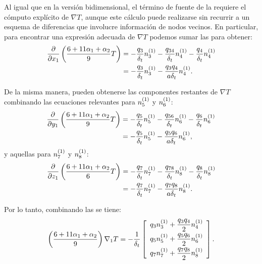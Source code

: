 Al igual que en la versi\'on bidimensional, el t\'ermino de fuente de la  requiere el c\'omputo expl\'icito de $\nabla T$, aunque este c\'alculo puede realizarse sin recurrir a un esquema de diferencias que involucre informaci\'on de nodos vecinos. En particular, para encontrar una expresi\'on adecuada de $\nabla T$ podemos sumar las  para obtener:
\begin{equation}
\begin{aligned}
	\dfrac{\partial}{\partial x_1} \left( \dfrac{6+11\alpha_1+\alpha_2}{9} T \right) &= -\dfrac{q_3}{\delta_t} n_{3}^{(1)} - \dfrac{q_{34}}{\delta_t} n_{4}^{(1)} - \dfrac{q_4}{\delta_t} n_{4}^{(1)} \\
	&= -\dfrac{q_3}{\delta_t} n_{3}^{(1)} - \dfrac{q_3 q_4}{a \delta_t} n_{4}^{(1)}.
\end{aligned}
	\label{eq:partial_1_x_3d}
\end{equation}

De la misma manera, pueden obtenerse las componentes restantes de $\nabla T$ combinando las ecuaciones relevantes para $n_{5}^{(1)}$ y $n_{6}^{(1)}$:
\begin{equation}
\begin{aligned}
	\dfrac{\partial}{\partial y_1} \left( \dfrac{6+11\alpha_1+\alpha_2}{9} T \right) &= -\dfrac{q_5}{\delta_t} n_{5}^{(1)} - \dfrac{q_{56}}{\delta_t} n_{6}^{(1)} - \dfrac{q_6}{\delta_t} n_{6}^{(1)} \\
	&= -\dfrac{q_5}{\delta_t} n_{5}^{(1)} - \dfrac{q_5 q_6}{a \delta_t} n_{6}^{(1)},
\end{aligned}
	\label{eq:partial_1_y_3d}
\end{equation}
y aquellas para $n_{7}^{(1)}$ y $n_{8}^{(1)}$:
\begin{equation}
\begin{aligned}
	\dfrac{\partial}{\partial z_1} \left( \dfrac{6+11\alpha_1+\alpha_2}{6} T \right) &= -\dfrac{q_7}{\delta_t} n_{7}^{(1)} - \dfrac{q_{78}}{\delta_t} n_{8}^{(1)} - \dfrac{q_8}{\delta_t} n_{8}^{(1)} \\
	&= -\dfrac{q_7}{\delta_t} n_{7}^{(1)} - \dfrac{q_7 q_8}{a \delta_t} n_{8}^{(1)}.
\end{aligned}
	\label{eq:partial_1_z_3d}
\end{equation}

Por lo tanto, combinando las  se tiene:
\begin{equation}
	\left( \dfrac{6+11\alpha_1+\alpha_2}{9} \right) \nabla_1 T= -\dfrac{1}{\delta_t}
	\left[ 
 	\begin{array}{c} 
 		q_3 n_{3}^{(1)}  +  \dfrac{q_3q_4}{2}n_{4}^{(1)} \\[2mm]
 		q_5 n_{5}^{(1)}  +  \dfrac{q_5q_6}{2}n_{6}^{(1)} \\[2mm]
 		q_7 n_{7}^{(1)}  +  \dfrac{q_7q_8}{2}n_{8}^{(1)}
 	\end{array} 
	\right].
	\label{eq:grad1_T_3d}
\end{equation}

